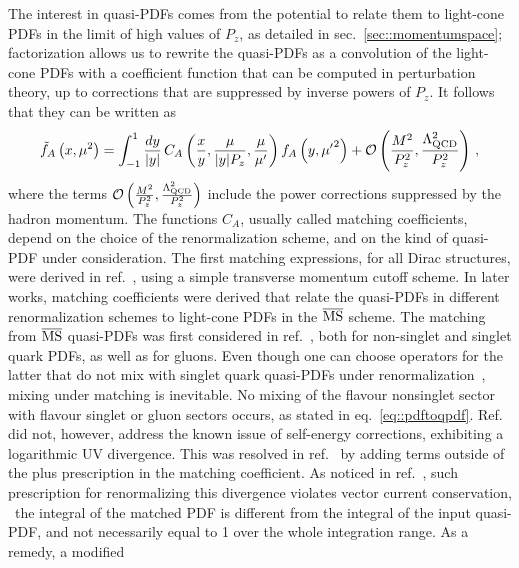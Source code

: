 The interest in quasi-PDFs comes from the potential to relate them to light-cone
PDFs in the limit of high values of $P_z$, as detailed in sec.~\ref{sec::momentumspace};
factorization allows us to rewrite the quasi-PDFs as a convolution of the
light-cone PDFs with a coefficient function that can be computed in perturbation
theory, up to corrections that are suppressed by inverse powers of $P_z$.
It follows that they can be written as
\begin{align}
	\label{eq::pdftoqpdf}                                                                             
	\tilde{f}_A\left( x , {\mu}^2 \right) =                                                               
	\int_{-1}^{1} \frac{dy}{|y|}\, C_A\left(\frac{x}{y},\frac{\mu}{|y|P_z},\frac{\mu}{\mu'} \right)  f_A\left( y, {\mu'}^2\right) 
	+ \mathcal{O}\left( \frac{M^2}{P_z^2},\frac{\Lambda^2_{\text{QCD}}}{P_z^2} \right)\, ,                   
\end{align}
where the terms $\mathcal{O}\left(
\frac{M^2}{P_z^2},\frac{\Lambda^2_{\text{QCD}}}{P_z^2} \right) $ include
the power corrections suppressed by the hadron momentum. The functions $C_A$,
usually called matching coefficients, depend on the choice of the
renormalization scheme, and on the kind of quasi-PDF under consideration. The
first matching expressions, for all Dirac structures, were derived in
ref.~\cite{Xiong:2013bka}, using a simple transverse momentum cutoff scheme. In
later works, matching coefficients were derived that relate the quasi-PDFs in
different renormalization schemes to light-cone PDFs in the $\overline{\mathrm{MS}}$ scheme. The
matching from $\overline{\mathrm{MS}}$ quasi-PDFs was first considered in
ref.~\cite{Wang:2017qyg}, both for non-singlet and singlet quark PDFs, as well
as for gluons. Even though one can choose operators for the latter that do not
mix with singlet quark quasi-PDFs under
renormalization~\cite{Zhang:2018diq,Li:2018tpe}, mixing under matching is
inevitable. 
No mixing of the flavour nonsinglet sector with flavour singlet or
gluon sectors occurs, as stated in eq.~\eqref{eq::pdftoqpdf}. Ref.~\cite{Wang:2017qyg} did not, however, address the
known issue of self-energy corrections, exhibiting a logarithmic UV divergence.
This was resolved in ref.~\cite{Izubuchi:2018srq} by adding terms outside of the
plus prescription in the matching coefficient. As noticed in
ref.~\cite{Alexandrou:2018pbm}, such prescription for renormalizing this
divergence violates vector current conservation, \ie\ the integral of the
matched PDF is different from the integral of the input quasi-PDF, and not
necessarily equal to 1 over the whole integration range. As a remedy, a modified
